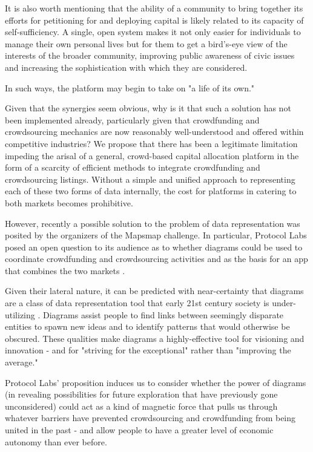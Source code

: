 \documentclass{article}
\begin{document}
\begin{multicols}{2}
It is also worth mentioning that the ability of a community to bring together its efforts for petitioning for and deploying capital is likely related to its capacity of self-sufficiency. A single, open system makes it not only easier for individuals to manage their own personal lives but for them to get a bird's-eye view of the interests of the broader community, improving public awareness of civic issues and increasing the sophistication with which they are considered.

In such ways, the platform may begin to take on "a life of its own."

Given that the synergies seem obvious, why is it that such a solution has not been implemented already, particularly given that crowdfunding and crowdsourcing mechanics are now reasonably well-understood and offered within competitive industries? We propose that there has been a legitimate limitation impeding the arisal of a general, crowd-based capital allocation platform in the form of a scarcity of efficient methods to integrate crowdfunding and crowdsourcing listings. Without a simple and unified approach to representing each of these two forms of data internally, the cost for platforms in catering to both markets becomes prohibitive.

However, recently a possible solution to the problem of data representation was posited by the organizers of the Mapsmap challenge. In particular, Protocol Labs posed an open question to its audience as to whether diagrams could be used to coordinate crowdfunding and crowdsourcing activities and as the basis for an app that combines the two markets \phantom{[1]}.

Given their lateral nature, it can be predicted with near-certainty that diagrams are a class of data representation tool that early 21st century society is under-utilizing \phantom{[2]}. Diagrams assist people to find links between seemingly disparate entities to spawn new ideas and to identify patterns that would otherwise be obscured. These qualities make diagrams a highly-effective tool for visioning and innovation - and for "striving for the exceptional" rather than "improving the average."

Protocol Labs' proposition induces us to consider whether the power of diagrams (in revealing possibilities for future exploration that have previously gone unconsidered) could act as a kind of magnetic force that pulls us through whatever barriers have prevented crowdsourcing and crowdfunding from being united in the past - and allow people to have a greater level of economic autonomy than ever before.


\end{multicols}
\end{document}

